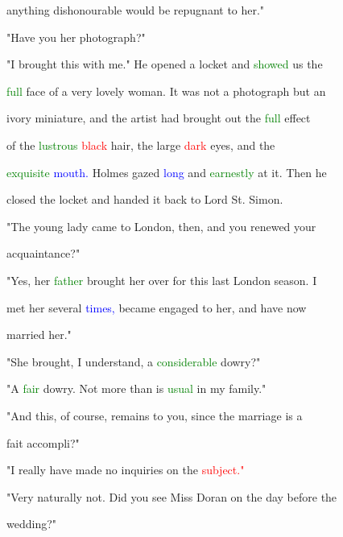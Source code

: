  anything dishonourable would be repugnant to her."



 "Have you her photograph?"



 "I brought this with me." He opened a locket and \textcolor{green}{showed} us the

 \textcolor{green}{full} face of a very \textcolor{BurntOrange}{lovely} woman. It was not a photograph but an

 ivory miniature, and the artist had brought out the \textcolor{green}{full} effect

 of the \textcolor{green}{lustrous} \textcolor{red}{black} hair, the large \textcolor{red}{dark} eyes, and the

 \textcolor{green}{exquisite} \textcolor{blue}{mouth.} Holmes gazed \textcolor{blue}{long} and \textcolor{green}{earnestly} at it. Then he

 closed the locket and handed it back to \textcolor{BurntOrange}{Lord} St. Simon.



 "The \textcolor{BurntOrange}{young} lady came to London, then, and you renewed your

 acquaintance?"



 "Yes, her \textcolor{green}{father} brought her over for this last London season. I

 met her several \textcolor{blue}{times,} became engaged to her, and have now

 married her."



 "She brought, I understand, a \textcolor{green}{considerable} dowry?"



 "A \textcolor{green}{fair} dowry. Not more than is \textcolor{green}{usual} in my family."



 "And this, of course, \textcolor{BurntOrange}{remains} to you, since the \textcolor{BurntOrange}{marriage} is a

 fait accompli?"



 "I really have made no \textcolor{BurntOrange}{inquiries} on the \textcolor{red}{subject."}



 "Very naturally not. Did you see Miss Doran on the day before the

 wedding?"



